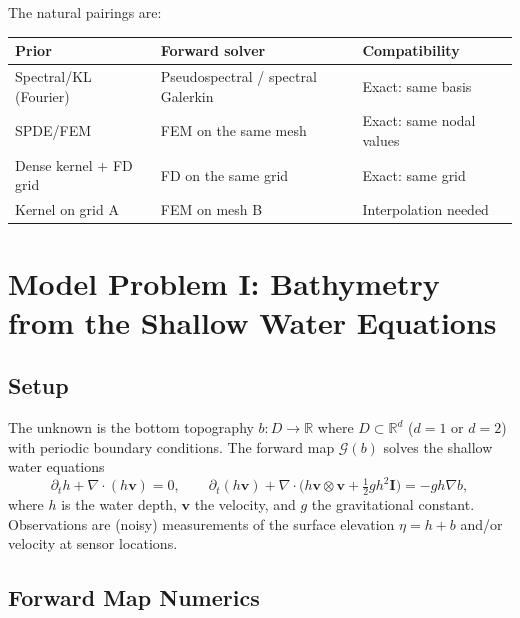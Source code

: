 \documentclass[11pt]{article}
\newcommand{\R}{\mathbb{R}}
\begin{document}
The natural pairings are:
\begin{center}
\renewcommand{\arraystretch}{1.3}
\begin{tabular}{@{}lll@{}}
\toprule
\textbf{Prior} & \textbf{Forward solver} & \textbf{Compatibility} \\
\midrule
Spectral/KL (Fourier) & Pseudospectral / spectral Galerkin & Exact: same basis \\
SPDE/FEM & FEM on the same mesh & Exact: same nodal values \\
Dense kernel + FD grid & FD on the same grid & Exact: same grid \\
Kernel on grid A & FEM on mesh B & Interpolation needed \\
\bottomrule
\end{tabular}
\end{center}


\section{Model Problem I: Bathymetry from the Shallow Water Equations}\label{sec:SWE}

\subsection{Setup}

The unknown is the bottom topography $b: D \to \R$ where $D \subset \R^d$ ($d=1$ or $d=2$) with periodic boundary conditions.  The forward map $\mathcal{G}(b)$ solves the shallow water equations
\[
  \partial_t h + \nabla \cdot (h \mathbf{v}) = 0,
  \qquad
  \partial_t (h\mathbf{v}) + \nabla \cdot \bigl(h \mathbf{v} \otimes \mathbf{v} + \tfrac{1}{2}g h^2 \mathbf{I}\bigr) = -g h \nabla b,
\]
where $h$ is the water depth, $\mathbf{v}$ the velocity, and $g$ the gravitational constant.  Observations are (noisy) measurements of the surface elevation $\eta = h + b$ and/or velocity at sensor locations.

\subsection{Forward Map Numerics}\label{sec:SWE_numerics}
\end{document}
